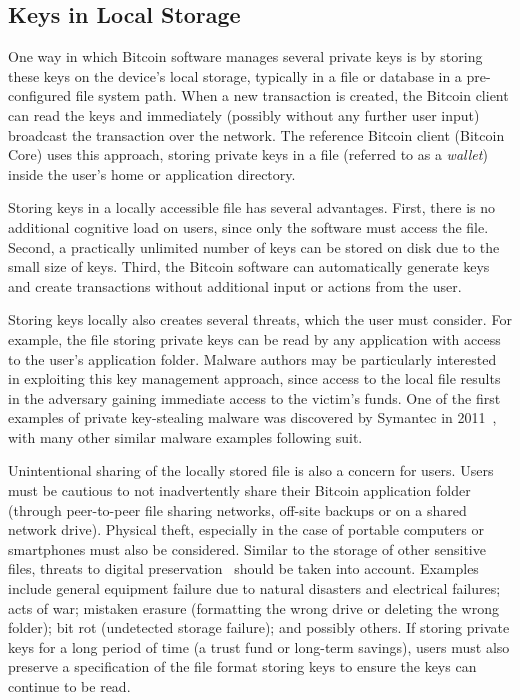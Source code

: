 
\subsection{Keys in Local Storage}
\label{sec:localstorage}
One way in which Bitcoin software manages several private keys is by storing these keys on the device's local storage, typically in a file or database in a pre-configured file system path. When a new transaction is created, the Bitcoin client can read the keys and immediately (possibly without any further user input) broadcast the transaction over the network. The reference Bitcoin client (Bitcoin Core) uses this approach, storing private keys in a file (referred to as a \emph{wallet}) inside the user's home or application directory. 

Storing keys in a locally accessible file has several advantages. First, there is no additional cognitive load on users, since only the software must access the file. Second, a practically unlimited number of keys can be stored on disk due to the small size of keys. Third, the Bitcoin software can automatically generate keys and create transactions without additional input or actions from the user. 

Storing keys locally also creates several threats, which the user must consider. For example, the file storing private keys can be read by any application with access to the user's application folder. Malware authors may be particularly interested in exploiting this key management approach, since access to the local file results in the adversary gaining immediate access to the victim's funds. One of the first examples of private key-stealing malware was discovered by Symantec in 2011~\cite{coinbit}, with many other similar malware examples following suit.


Unintentional sharing of the locally stored file is also a concern for users. Users must be cautious to not inadvertently share their Bitcoin application folder (\eg through peer-to-peer file sharing networks, off-site backups or on a shared network drive). Physical theft, especially in the case of portable computers or smartphones must also be considered. Similar to the storage of other sensitive files, threats to digital preservation~\cite{BKM05} should be taken into account. Examples include general equipment failure due to natural disasters and electrical failures; acts of war; mistaken erasure (\eg formatting the wrong drive or deleting the wrong folder); bit rot (\ie undetected storage failure); and possibly others. If storing private keys for a long period of time (\eg a trust fund or long-term savings), users must also preserve a specification of the file format storing keys to ensure the keys can continue to be read.

